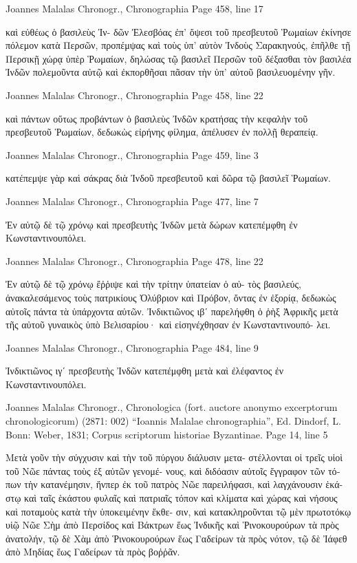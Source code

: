 \documentclass[12pt,letterpaper,twoside,final]{memoir}
\begin{document}
\begin{greek}
Joannes Malalas Chronogr., Chronographia 
Page 458, line 17

                                      καὶ εὐθέως ὁ βασιλεὺς Ἰν-
δῶν Ἐλεσβόας ἐπ' ὄψεσι τοῦ πρεσβευτοῦ Ῥωμαίων ἐκίνησε 
πόλεμον κατὰ Περσῶν, προπέμψας καὶ τοὺς ὑπ' αὐτὸν Ἰνδοὺς 
Σαρακηνούς, ἐπῆλθε τῇ Περσικῇ χώρᾳ ὑπὲρ Ῥωμαίων, δηλώσας 
τῷ βασιλεῖ Περσῶν τοῦ δέξασθαι τὸν βασιλέα Ἰνδῶν πολεμοῦντα 
αὐτῷ καὶ ἐκπορθῆσαι πᾶσαν τὴν ὑπ' αὐτοῦ βασιλευομένην γῆν. 



Joannes Malalas Chronogr., Chronographia 
Page 458, line 22

καὶ πάντων οὕτως προβάντων ὁ βασιλεὺς Ἰνδῶν κρατήσας τὴν   
κεφαλὴν τοῦ πρεσβευτοῦ Ῥωμαίων, δεδωκὼς εἰρήνης φίλημα, 
ἀπέλυσεν ἐν πολλῇ θεραπείᾳ. 



Joannes Malalas Chronogr., Chronographia 
Page 459, line 3

                                   κατέπεμψε γὰρ καὶ σάκρας διὰ 
Ἰνδοῦ πρεσβευτοῦ καὶ δῶρα τῷ βασιλεῖ Ῥωμαίων. 




Joannes Malalas Chronogr., Chronographia 
Page 477, line 7

Ἐν αὐτῷ δὲ τῷ χρόνῳ καὶ πρεσβευτὴς Ἰνδῶν μετὰ δώρων 
κατεπέμφθη ἐν Κωνσταντινουπόλει. 



Joannes Malalas Chronogr., Chronographia 
Page 478, line 22

Ἐν αὐτῷ δὲ τῷ χρόνῳ ἔῤῥιψε καὶ τὴν τρίτην ὑπατείαν ὁ αὐ-
τὸς βασιλεύς, ἀνακαλεσάμενος τοὺς πατρικίους Ὀλύβριον καὶ 
Πρόβον, ὄντας ἐν ἐξορίᾳ, δεδωκὼς αὐτοῖς πάντα τὰ ὑπάρχοντα 
αὐτῶν. 
 Ἰνδικτιῶνος ιβʹ παρελήφθη ὁ ῥὴξ Ἀφρικῆς μετὰ τῆς αὐτοῦ   
γυναικὸς ὑπὸ Βελισαρίου· καὶ εἰσηνέχθησαν ἐν Κωνσταντινουπό-
λει. 



Joannes Malalas Chronogr., Chronographia 
Page 484, line 9

Ἰνδικτιῶνος ιγʹ πρεσβευτὴς Ἰνδῶν κατεπέμφθη μετὰ καὶ 
ἐλέφαντος ἐν Κωνσταντινουπόλει. 



Joannes Malalas Chronogr., Chronologica (fort. auctore anonymo excerptorum chronologicorum) (2871: 002)
“Ioannis Malalae chronographia”, Ed. Dindorf, L.
Bonn: Weber, 1831; Corpus scriptorum historiae Byzantinae.
Page 14, line 5

Μετὰ γοῦν τὴν σύγχυσιν καὶ τὴν τοῦ πύργου διάλυσιν μετα-
στέλλονται οἱ τρεῖς υἱοὶ τοῦ Νῶε πάντας τοὺς ἐξ αὐτῶν γενομέ-
νους, καὶ διδόασιν αὐτοῖς ἔγγραφον τῶν τόπων τὴν κατανέμησιν,   
ἥνπερ ἐκ τοῦ πατρὸς Νῶε παρειλήφασι, καὶ λαγχάνουσιν ἑκά-
στῳ καὶ ταῖς ἑκάστου φυλαῖς καὶ πατριαῖς τόπον καὶ κλίματα 
καὶ χώρας καὶ νήσους καὶ ποταμοὺς κατὰ τὴν ὑποκειμένην ἔκθε-
σιν, καὶ κατακληροῦνται τῷ μὲν πρωτοτόκῳ υἱῷ Νῶε Σὴμ ἀπὸ 
Περσίδος καὶ Βάκτρων ἕως Ἰνδικῆς καὶ Ῥινοκουρούρων τὰ πρὸς 
ἀνατολήν, τῷ δὲ Χὰμ ἀπὸ Ῥινοκουρούρων ἕως Γαδείρων τὰ 
πρὸς νότον, τῷ δὲ Ἰάφεθ ἀπὸ Μηδίας ἕως Γαδείρων τὰ πρὸς 
βοῤῥᾶν. 




\end{greek}
\end{document}
